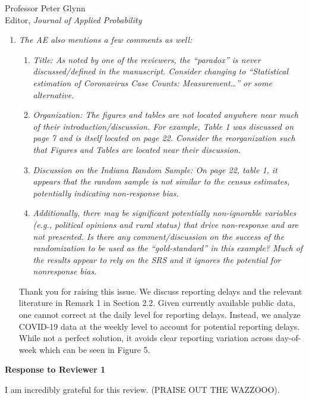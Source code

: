 \documentclass[11pt]{letter} %
\begin{document}
\begin{letter}{Professor
	Peter Glynn\\
	Editor, {\em Journal of Applied Probability}}
\begin{enumerate}
\item {\it The AE also mentions a few comments as well:}
\begin{enumerate}
	\item {\it Title: As noted by one of the reviewers, the “paradox” is never discussed/defined in the manuscript. Consider changing to “Statistical estimation of Coronavirus Case Counts: Measurement…” or some alternative.}
	\item {\it Organization: The figures and tables are not located anywhere near much of their introduction/discussion. For example, Table 1 was discussed on page 7 and is itself located on page 22. Consider the reorganization such that Figures and Tables are located near their discussion.}
	\item {\it Discussion on the Indiana Random Sample: On page 22, table 1, it appears that the random sample is not similar to the census estimates, potentially indicating non-response bias.}
	\item {\it Additionally, there may be significant potentially non-ignorable variables (e.g., political opinions and rural status) that drive non-response and are not presented. Is there any comment/discussion on the success of the randomization to be used as the “gold-standard” in this example? Much of the results appear to rely on the SRS and it ignores the potential for nonresponse bias.}
\end{enumerate}

\vspace{5mm}
Thank you for raising this issue.  We discuss reporting delays and the relevant literature in Remark 1 in Section 2.2.  Given currently available public data, one cannot correct at the daily level for reporting delays.  Instead, we analyze COVID-19 data at the weekly level to account for potential reporting delays.  While not a perfect solution, it avoids clear reporting variation across day-of-week which can be seen in Figure 5.
\vspace{5mm}
\end{enumerate}
\newpage
{\bf Response to Reviewer 1}
\vspace{5mm}

I am incredibly grateful for this review. (PRAISE OUT THE WAZZOOO).


\end{letter}
\end{document}
